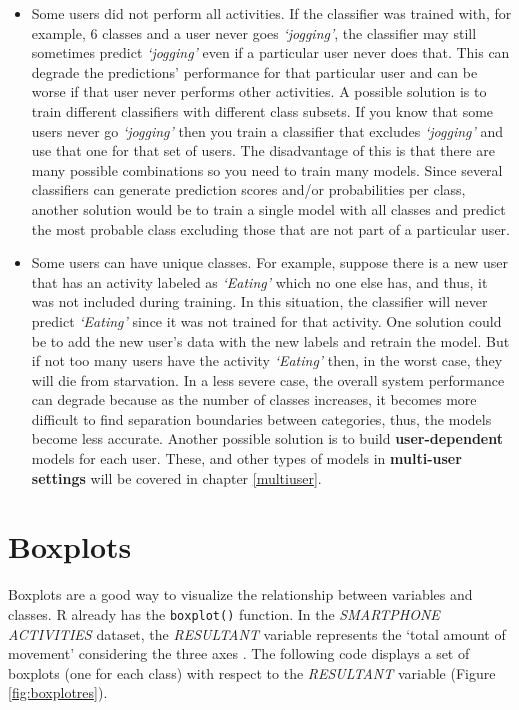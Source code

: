 \documentclass[
  11pt,
]{krantz}
\begin{document}
\begin{itemize}
\item
  Some users did not perform all activities. If the classifier was trained with, for example, \(6\) classes and a user never goes \emph{`jogging'}, the classifier may still sometimes predict \emph{`jogging'} even if a particular user never does that. This can degrade the predictions' performance for that particular user and can be worse if that user never performs other activities. A possible solution is to train different classifiers with different class subsets. If you know that some users never go \emph{`jogging'} then you train a classifier that excludes \emph{`jogging'} and use that one for that set of users. The disadvantage of this is that there are many possible combinations so you need to train many models. Since several classifiers can generate prediction scores and/or probabilities per class, another solution would be to train a single model with all classes and predict the most probable class excluding those that are not part of a particular user.
\item
  Some users can have unique classes. For example, suppose there is a new user that has an activity labeled as \emph{`Eating'} which no one else has, and thus, it was not included during training. In this situation, the classifier will never predict \emph{`Eating'} since it was not trained for that activity. One solution could be to add the new user's data with the new labels and retrain the model. But if not too many users have the activity \emph{`Eating'} then, in the worst case, they will die from starvation. In a less severe case, the overall system performance can degrade because as the number of classes increases, it becomes more difficult to find separation boundaries between categories, thus, the models become less accurate. Another possible solution is to build \textbf{user-dependent} models for each user. These, and other types of models in \textbf{multi-user settings} will be covered in chapter \ref{multiuser}.
\end{itemize}

\hypertarget{boxplots}{%
\section{Boxplots}\label{boxplots}}

Boxplots are a good way to visualize the relationship between variables and classes. R already has the \texttt{boxplot()} function. In the \emph{SMARTPHONE ACTIVITIES} dataset, the \emph{RESULTANT} variable represents the `total amount of movement' considering the three axes \citep{kwapisz2010}. The following code displays a set of boxplots (one for each class) with respect to the \emph{RESULTANT} variable (Figure \ref{fig:boxplotres}).
\end{document}
